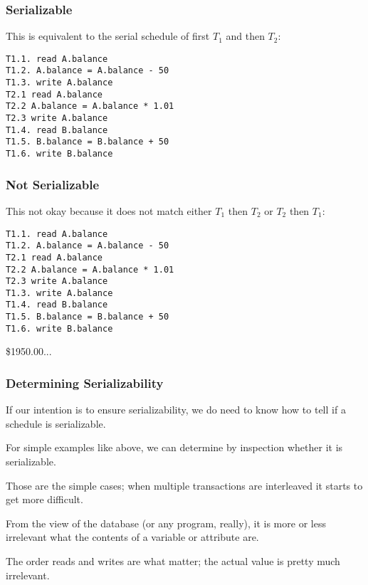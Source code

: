 \begin{frame}[fragile]
\frametitle{Serializable}

This is equivalent to the serial schedule of first $T_{1}$ and then $T_{2}$:

\begin{verbatim}
T1.1. read A.balance
T1.2. A.balance = A.balance - 50
T1.3. write A.balance
T2.1 read A.balance
T2.2 A.balance = A.balance * 1.01
T2.3 write A.balance
T1.4. read B.balance
T1.5. B.balance = B.balance + 50
T1.6. write B.balance
\end{verbatim}

\end{frame}

\begin{frame}[fragile]
\frametitle{Not Serializable}

This not okay because it does not match either $T_{1}$ then $T_{2}$ or $T_{2}$ then $T_{1}$:

\begin{verbatim}
T1.1. read A.balance
T1.2. A.balance = A.balance - 50
T2.1 read A.balance
T2.2 A.balance = A.balance * 1.01
T2.3 write A.balance
T1.3. write A.balance
T1.4. read B.balance
T1.5. B.balance = B.balance + 50
T1.6. write B.balance
\end{verbatim}

\$1950.00...

\end{frame}

\begin{frame}
\frametitle{Determining Serializability}


If our intention is to ensure serializability, we do need to know how to tell if a schedule is serializable. 

For simple examples like above, we can determine by inspection whether it is serializable.

Those are the simple cases; when multiple transactions are interleaved it starts to get more difficult.


From the view of the database (or any program, really), it is more or less irrelevant what the contents of a variable or attribute are. 

The order reads and writes are what matter; the actual value is pretty much irrelevant.

\end{frame}


